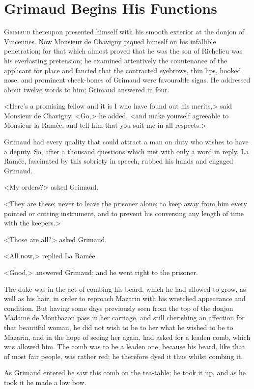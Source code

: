 \chapter{Grimaud Begins His Functions}

 \lettrine{G}{rimaud} thereupon presented himself with his smooth exterior at the donjon of Vincennes. Now Monsieur de Chavigny piqued himself on his infallible penetration; for that which almost proved that he was the son of Richelieu was his everlasting pretension; he examined attentively the countenance of the applicant for place and fancied that the contracted eyebrows, thin lips, hooked nose, and prominent cheek-bones of Grimaud were favourable signs. He addressed about twelve words to him; Grimaud answered in four.

<Here's a promising fellow and it is I who have found out his merits,> said Monsieur de Chavigny. <Go,> he added, <and make yourself agreeable to Monsieur la Ramée, and tell him that you suit me in all respects.>

Grimaud had every quality that could attract a man on duty who wishes to have a deputy. So, after a thousand questions which met with only a word in reply, La Ramée, fascinated by this sobriety in speech, rubbed his hands and engaged Grimaud.

<My orders?> asked Grimaud.

<They are these; never to leave the prisoner alone; to keep away from him every pointed or cutting instrument, and to prevent his conversing any length of time with the keepers.>

<Those are all?> asked Grimaud.

<All now,> replied La Ramée.

<Good,> answered Grimaud; and he went right to the prisoner.

The duke was in the act of combing his beard, which he had allowed to grow, as well as his hair, in order to reproach Mazarin with his wretched appearance and condition. But having some days previously seen from the top of the donjon Madame de Montbazon pass in her carriage, and still cherishing an affection for that beautiful woman, he did not wish to be to her what he wished to be to Mazarin, and in the hope of seeing her again, had asked for a leaden comb, which was allowed him. The comb was to be a leaden one, because his beard, like that of most fair people, was rather red; he therefore dyed it thus whilst combing it.

As Grimaud entered he saw this comb on the tea-table; he took it up, and as he took it he made a low bow.

